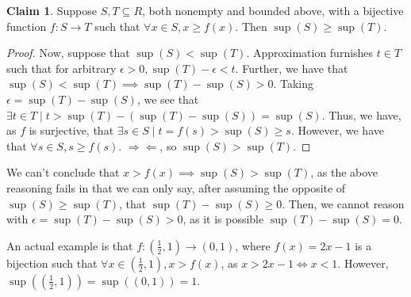 \documentclass[12pt,letterpaper]{article}
\theoremstyle{definition}
\newtheorem*{claim}{Claim}
\newcommand{\contra}{\Rightarrow\!\Leftarrow}
\begin{document}
\begin{claim}
  Suppose $S,T \subseteq R$, both nonempty and bounded above, with a bijective
  function $f: S \rightarrow T$ such that $\forall x \in S, x \geq f(x)$. Then
  $\sup(S) \geq \sup(T)$.
\end{claim}




\begin{proof}
  Now, suppose that $\sup(S) < \sup(T)$. Approximation furnishes $t \in T$ such
  that for arbitrary $\epsilon > 0, \sup(T) - \epsilon < t$. Further, we have
  that $\sup(S) < \sup(T) \implies \sup(T) - \sup(S) > 0$. Taking $\epsilon
  = \sup(T) - \sup(S)$, we see that $\exists t \in T \mid t > \sup(T) - (\sup(T)
  - \sup(S)) = \sup(S)$. Thus, we have, as $f$ is surjective, that $\exists s \in S \mid t = f(s) > \sup(S)
  \geq s$. However, we have that $\forall s \in S, s \geq f(s)$. $\contra$, so
  $\sup(S) > \sup(T)$.
\end{proof}

We can't conclude that $x > f(x) \implies \sup(S) > \sup(T)$, as the above
reasoning fails in that we can only say, after assuming the opposite of
$\sup(S) \geq \sup(T)$, that $\sup(T) - \sup(S) \geq 0$. Then, we cannot
reason with $\epsilon = \sup(T) - \sup(S) > 0$, as it  is possible $\sup(T) -
\sup(S) = 0$.

An actual example is that $f: (\frac{1}{2},1) \rightarrow (0,1)$, where $f(x)
= 2x - 1$ is a bijection such that $\forall x \in (\frac{1}{2}, 1), x > f(x)$,
as $x > 2x - 1  \iff x < 1$. However, $\sup((\frac{1}{2}, 1)) = \sup((0,1)) = 1$.
  
\end{document}
